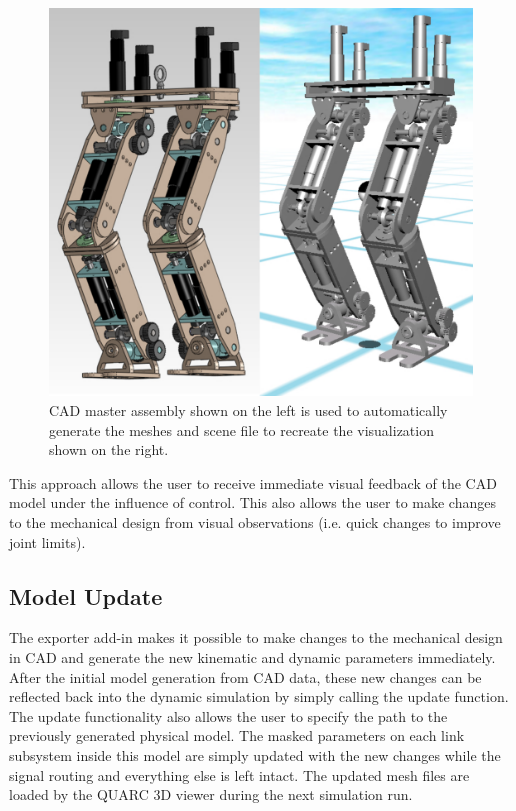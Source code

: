 \begin{figure}[!h]
	\centering
    \includegraphics[scale=0.50]{fig/toolchain/masterscene.pdf}
  	\caption{CAD master assembly shown on the left is used to automatically generate the meshes and scene file to recreate the visualization shown on the right.}
	\label{fig:masterscene}
\end{figure}

This approach allows the user to receive immediate visual feedback of the CAD model under the influence of control. This also allows the user to make changes to the mechanical design from visual observations (i.e. quick changes to improve joint limits).

\subsection{Model Update} %
\label{sub:model_update}
The exporter add-in makes it possible to make changes to the mechanical design in CAD and generate the new kinematic and dynamic parameters immediately. After the initial model generation from CAD data, these new changes can be reflected back into the dynamic simulation by simply calling the update function. The update functionality also allows the user to specify the path to the previously generated physical model. The masked parameters on each link subsystem inside this model are simply updated with the new changes while the signal routing and everything else is left intact. The updated mesh files are loaded by the QUARC 3D viewer during the next simulation run.

